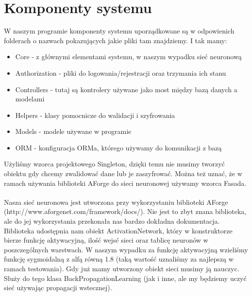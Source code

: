 \documentclass[12pt,a4paper]{article}
\begin{document}
\section*{Komponenty systemu}
W naszym programie komponenty systemu uporządkowane są w odpowienich folderach o nazwach pokazujących jakie pliki tam znajdziemy. I tak mamy:\\
\begin{itemize}
\item Core - z głównymi elementami systemu, w naszym wypadku sieć neuronową\\
\item Authorization - pliki do logowania/rejestracji oraz trzymania ich stanu\\
\item Controllers - tutaj są kontrolery używane jako most między bazą danych a modelami\\
\item Helpers - klasy pomocnicze do walidacji i szyfrowania\\
\item Models - modele używane w programie\\
\item ORM - konfiguracja ORMa, którego używamy do komunikacji z bazą\\
\end{itemize}

Użyliśmy wzorca projektowego Singleton, dzięki temu nie musimy tworzyć obiektu gdy chcemy zwalidować dane lub je zaszyfrować. Można też uznać, że w ramach używania biblioteki AForge do sieci neuronowej używamy wzorca Fasada.\\\\

Nasza sieć neuronowa jest utworzona przy wykorzystaniu biblioteki AForge \\(http://www.aforgenet.com/framework/docs/). Nie jest to zbyt znana biblioteka, ale do jej wykorzystania przekonała nas bardzo dokładna dokumentacja.\\
Biblioteka udostępnia nam obiekt ActivationNetwork, który w konstruktorze bierze funkcję aktywacyjną, ilość wejsć sieci oraz tablicę neuronów w poszczególnych warstwach. W naszym wypadku za funkcję aktywacyjną wzieliśmy funkcję sygmoidalną z alfą równą 1.8 (taką wartość uznaliśmy za najlepszą w ramach testowania). Gdy już mamy utworzony obiekt sieci musimy ją nauczyc. Służy do tego klasa BackPropagationLearning (jak i inne, ale my będziemy uczyć sieć używając propagacji wstecznej).
	
\end{document}
